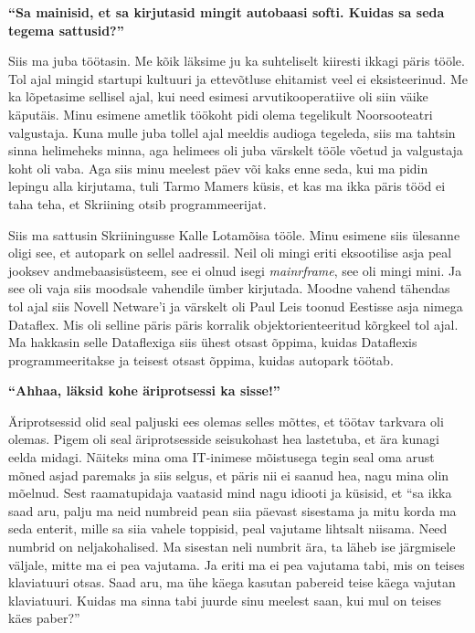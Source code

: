 \textbf{\enquote{Sa mainisid, et sa kirjutasid mingit autobaasi softi. Kuidas sa seda tegema sattusid?}}

Siis ma juba töötasin. Me kõik läksime ju ka suhteliselt kiiresti ikkagi päris tööle. Tol ajal mingid startupi kultuuri ja ettevõtluse ehitamist veel ei eksisteerinud. Me ka lõpetasime sellisel ajal, kui need esimesi arvutikooperatiive oli siin väike käputäis. Minu esimene ametlik töökoht pidi olema tegelikult Noorsooteatri valgustaja. Kuna mulle juba tollel ajal meeldis audioga tegeleda, siis ma tahtsin sinna helimeheks minna, aga helimees oli juba värskelt tööle võetud ja valgustaja koht oli vaba. Aga siis minu meelest päev või kaks enne seda, kui ma pidin lepingu alla kirjutama, tuli Tarmo Mamers küsis, et kas ma ikka päris tööd ei taha teha, et Skriining otsib programmeerijat. 

Siis ma sattusin Skriiningusse Kalle Lotamõisa tööle. Minu esimene siis ülesanne oligi see, et autopark on sellel aadressil. Neil oli mingi eriti eksootilise asja peal jooksev andmebaasisüsteem, see ei olnud isegi \emph{mainrframe}, see oli mingi mini. Ja  see oli vaja siis moodsale vahendile ümber kirjutada. Moodne vahend tähendas tol ajal siis Novell Netware'i ja värskelt oli Paul Leis toonud Eestisse asja nimega Dataflex. Mis oli selline päris päris korralik objektorienteeritud kõrgkeel tol ajal. Ma hakkasin selle Dataflexiga siis ühest otsast õppima, kuidas Dataflexis programmeeritakse ja teisest otsast õppima, kuidas autopark töötab. 

\textbf{\enquote{Ahhaa, läksid kohe äriprotsessi ka sisse!}}

Äriprotsessid olid seal paljuski ees olemas selles mõttes, et töötav tarkvara oli olemas. Pigem oli seal äriprotsesside seisukohast hea lastetuba, et ära kunagi eelda midagi. Näiteks mina oma IT-inimese mõistusega tegin seal oma arust mõned asjad paremaks ja siis selgus, et päris nii ei saanud hea, nagu mina olin mõelnud. Sest raamatupidaja vaatasid mind nagu idiooti ja küsisid, et \enquote{sa ikka saad aru, palju ma neid numbreid pean siia päevast sisestama ja mitu korda ma seda enterit, mille sa siia vahele toppisid, peal vajutame lihtsalt niisama. Need numbrid on neljakohalised. Ma sisestan neli numbrit ära, ta läheb ise järgmisele väljale, mitte ma ei pea vajutama. Ja eriti ma ei pea vajutama tabi, mis on teises klaviatuuri otsas. Saad aru, ma ühe käega kasutan pabereid teise käega vajutan klaviatuuri. Kuidas ma sinna tabi juurde sinu meelest saan, kui mul on teises käes paber?} 


